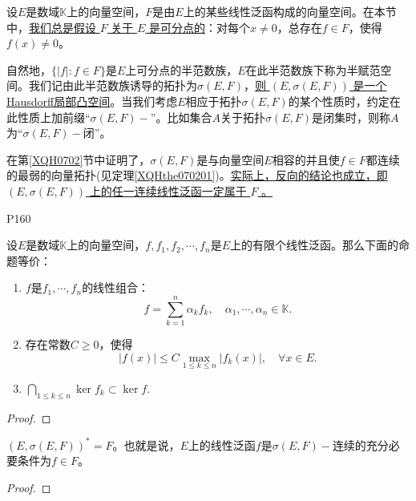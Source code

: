 \original
{
	设$E$是数域$\mathbb{K}$上的向量空间，$F$是由$E$上的某些线性泛函构成的向量空间。在本节中，\uline{我们总是假设 $F$ 关于 $E$ 是可分点的}：对每个$x\neq 0$，总存在$f\in F$，使得$f(x)\neq 0$。
	\par
	自然地，$\{|f|:f\in F\}$是$E$上可分点的半范数族，$E$在此半范数族下称为半赋范空间。我们记由此半范数族诱导的拓扑为$\sigma(E,F)$，\uline{则 $(E,\sigma(E,F))$ 是一个Hausdorff局部凸空间}。当我们考虑$E$相应于拓扑$\sigma(E,F)$的某个性质时，约定在此性质上加前缀“$\sigma(E,F)-$”。比如集合$A$关于拓扑$\sigma (E,F)$是闭集时，则称$A$为“$\sigma(E,F)-$闭”。
	\par
	在第\ref{XQH0702}节中证明了，$\sigma(E,F)$是与向量空间$E$相容的并且使$f\in F$都连续的最弱的向量拓扑(见定理\ref{XQHthe070201})。\uline{实际上，反向的结论也成立，即 $(E,\sigma(E,F))$ 上的任一连续线性泛函一定属于 $F$ 。}
}
{P160}

\begin{lemma}
	设$E$是数域$\mathbb{K}$上的向量空间，$f,f_{1},f_{2},\cdots,f_{n}$是$E$上的有限个线性泛函。那么下面的命题等价：
	\begin{enumerate}
		\item $f$是$f_{1},\cdots,f_{n}$的线性组合：
		\begin{equation*}
			f=\sum_{k=1}^{n}\alpha_{k}f_{k},\quad \alpha_{1},\cdots,\alpha_{n}\in \mathbb{K}.
		\end{equation*}
	
		\item 存在常数$C\geq 0$，使得
		\begin{equation*}
			|f(x)|\leq C\max_{1\leq k\leq n}|f_{k}(x)|,\quad \forall x\in E.
		\end{equation*}
		
		\item $\bigcap_{1\leq k\leq n}\ker f_{k}\subset \ker f.$
	\end{enumerate}
\end{lemma}

\begin{proof}
	
\end{proof}

\begin{theorem}\label{XQHthe080301}
	$(E,\sigma(E,F))^{*}=F$。也就是说，$E$上的线性泛函$f$是$\sigma(E,F)-$连续的充分必要条件为$f\in F$。
\end{theorem}

\begin{proof}
	
\end{proof}

